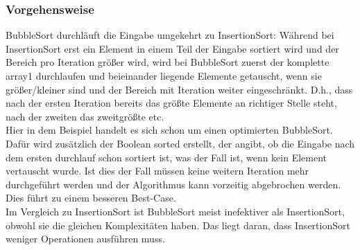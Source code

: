 \documentclass[
../../AuD-Zusammenfassung.tex,
]
{subfiles}
\begin{document}
\subsubsection{Vorgehensweise}
BubbleSort durchläuft die Eingabe umgekehrt zu InsertionSort: Während bei InsertionSort erst ein Element in einem Teil der Eingabe sortiert wird und der Bereich pro Iteration größer wird, wird bei BubbleSort zuerst der komplette array1 durchlaufen und beieinander liegende Elemente getauscht, wenn sie größer/kleiner sind und der Bereich mit Iteration weiter eingeschränkt. D.h., dass nach der ersten Iteration bereits das größte Elemente an richtiger Stelle steht, nach der zweiten das zweitgrößte etc.\\
Hier in dem Beispiel handelt es sich schon um einen optimierten BubbleSort. Dafür wird zusätzlich der Boolean sorted erstellt, der angibt, ob die Eingabe nach dem ersten durchlauf schon sortiert ist, was der Fall ist, wenn kein Element vertauscht wurde. Ist dies der Fall müssen keine weitern Iteration mehr durchgeführt werden und der Algorithmus kann vorzeitig abgebrochen werden. Dies führt zu einem besseren Best-Case. \\
Im Vergleich zu InsertionSort ist BubbleSort meist inefektiver als InsertionSort, obwohl sie die gleichen Komplexitäten haben. Das liegt daran, dass InsertionSort weniger Operationen ausführen muss.
\newpage
\end{document}
